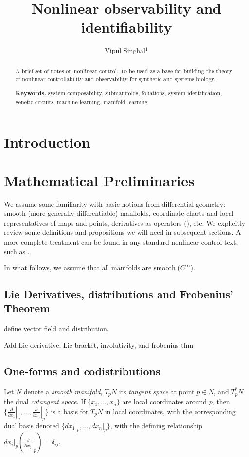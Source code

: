\documentclass[psamsfonts]{amsart}
\title{Nonlinear observability and identifiability}
\author{Vipul Singhal$^1$}
\theoremstyle{definition}
\theoremstyle{remark}
\numberwithin{equation}{section}
\begin{document}
\begin{abstract}
A brief set of notes on nonlinear control. To be used as a base for building the theory of nonlinear controllability and observability for synthetic and systems biology. 




\noindent \textbf{Keywords.} system composability, submanifolds, foliations, system identification, genetic circuits, machine learning, manifold learning
\end{abstract}

\maketitle
\tableofcontents

\section{Introduction}

\section{Mathematical Preliminaries}
We assume some familiarity with basic notions from differential geometry: smooth (more generally differentiable) manifolds, coordinate charts and local representatives of maps and points, derivatives as operators (\cite{boothby_2002}), etc. We explicitly review some definitions and propositions we will need in subsequent sections. A more complete treatment can be found in any standard nonlinear control text, such as \cite{nijmeijer_nonlinear_1990}. 

In what follows, we assume that all manifolds are smooth ($C^{\infty}$). 

\subsection{Lie Derivatives, distributions and Frobenius' Theorem}

define vector field and distribution. 

Add Lie derivative, Lie bracket, involutivity, and frobenius thm


\subsection{One-forms and codistributions}
Let $N$ denote a \textit{smooth manifold}, $T_pN $ its \textit{tangent space} at point $p \in N$, and $T^*_pN$ the dual \textit{cotangent space}. If $\{x_1, \dots, x_n\}$ are local coordinates around $p$, then
 $\{\left.\frac{\partial}{\partial x_1}\right\rvert_p,\dots, \left.\frac{\partial}{\partial x_n}\right\rvert_p \}$ is a basis for $T_pN$ in local coordinates, with the corresponding dual basis denoted $\{dx_1\vert_p, \dots, dx_n\vert_p\}$, with the defining relationship $dx_i\vert_p \left(\left.\frac{\partial}{\partial x_j}\right\rvert_p\right) = \delta_{ij}$. 
 
\end{document}
